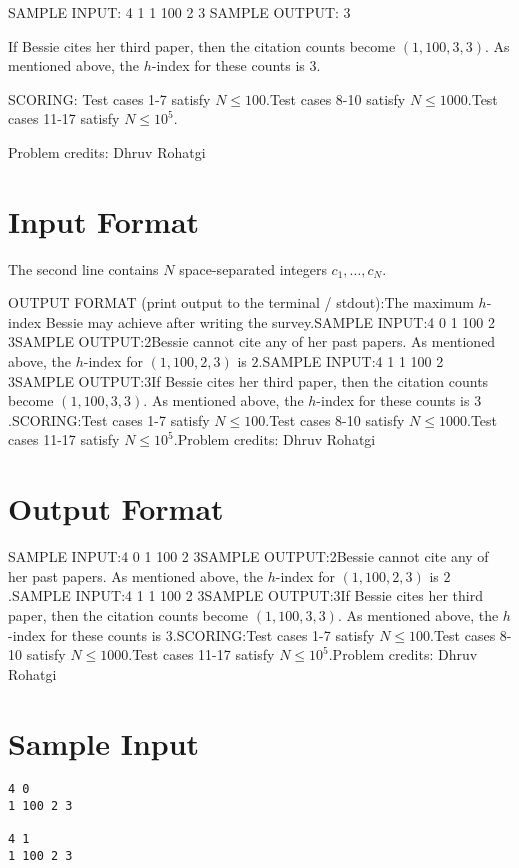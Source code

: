 \documentclass[12pt]{article}
\begin{document}
SAMPLE INPUT:
4 1
1 100 2 3
SAMPLE OUTPUT: 
3

If Bessie cites her third paper, then the citation counts become $(1,100,3,3)$.
As mentioned above, the $h$-index for these counts is $3$.

SCORING:
Test cases 1-7 satisfy $N \leq 100$.Test cases 8-10 satisfy $N \leq 1000$.Test cases 11-17 satisfy $N \leq 10^5$.


Problem credits: Dhruv Rohatgi



\section*{Input Format}
The second line contains $N$ space-separated integers $c_1,\ldots, c_N$.

OUTPUT FORMAT (print output to the terminal / stdout):The maximum $h$-index Bessie may achieve after writing the survey.SAMPLE INPUT:4 0
1 100 2 3SAMPLE OUTPUT:2Bessie cannot cite any of her past papers. As mentioned above, the $h$-index for
$(1,100,2,3)$ is $2$.SAMPLE INPUT:4 1
1 100 2 3SAMPLE OUTPUT:3If Bessie cites her third paper, then the citation counts become $(1,100,3,3)$.
As mentioned above, the $h$-index for these counts is $3$.SCORING:Test cases 1-7 satisfy $N \leq 100$.Test cases 8-10 satisfy $N \leq 1000$.Test cases 11-17 satisfy $N \leq 10^5$.Problem credits: Dhruv Rohatgi

\section*{Output Format}
SAMPLE INPUT:4 0
1 100 2 3SAMPLE OUTPUT:2Bessie cannot cite any of her past papers. As mentioned above, the $h$-index for
$(1,100,2,3)$ is $2$.SAMPLE INPUT:4 1
1 100 2 3SAMPLE OUTPUT:3If Bessie cites her third paper, then the citation counts become $(1,100,3,3)$.
As mentioned above, the $h$-index for these counts is $3$.SCORING:Test cases 1-7 satisfy $N \leq 100$.Test cases 8-10 satisfy $N \leq 1000$.Test cases 11-17 satisfy $N \leq 10^5$.Problem credits: Dhruv Rohatgi

\section*{Sample Input}
\begin{verbatim}
4 0
1 100 2 3

4 1
1 100 2 3
\end{verbatim}
\end{document}
